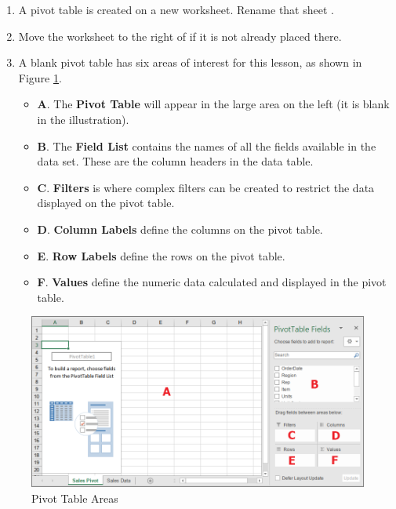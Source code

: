 \begin{enumerate}[resume]
	\item A pivot table is created on a new worksheet. Rename that sheet .
	\item Move the  worksheet to the right of  if it is not already placed there.
	\item A blank pivot table has six areas of interest for this lesson, as shown in Figure \ref{07:fig13}.

	\begin{itemize}
		\item \textbf{A}. The \textbf{Pivot Table} will appear in the large area on the left (it is blank in the illustration).
		\item \textbf{B}. The \textbf{Field List} contains the names of all the fields available in the data set. These are the column headers in the data table.
		\item \textbf{C}. \textbf{Filters} is where complex filters can be created to restrict the data displayed on the pivot table.
		\item \textbf{D}. \textbf{Column Labels} define the columns on the pivot table.
		\item \textbf{E}. \textbf{Row Labels} define the rows on the pivot table.
		\item \textbf{F}. \textbf{Values} define the numeric data calculated and displayed in the pivot table.
	\end{itemize}
\end{enumerate}

\begin{figure}[H]
	\centering
	\includegraphics[width=\maxwidth{.95\linewidth}]{gfx/ch07_fig13}
	\caption{Pivot Table Areas}
	\label{07:fig13}
\end{figure}

